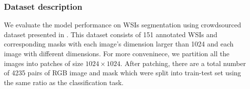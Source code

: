 \documentclass[review]{cvpr}
\begin{document}




\subsubsection{Dataset description}
We evaluate the model performance on WSIs segmentation using crowdsourced dataset presented in \cite{10.1093/bioinformatics/btz083}. This dataset consists of 151 annotated WSIs and corresponding masks with each image's dimension larger than 1024 and each image with different dimensions. For more conveninece, we partition all the images into patches of size $1024 \times 1024$. After patching, there are a total number of 4235 pairs of RGB image and mask which were split into train-test set using the same ratio as the classification task. 
\end{document}
